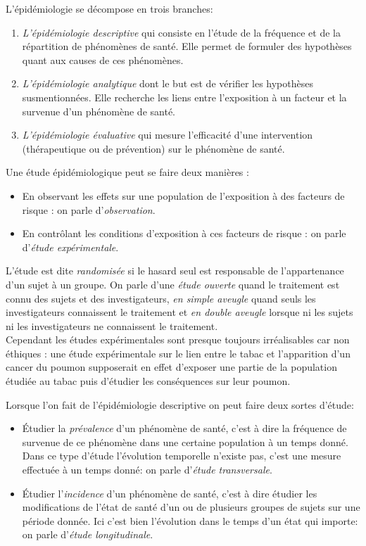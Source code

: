\documentclass{book}
\begin{document}
L'épidémiologie se décompose en trois branches:
\begin{enumerate}
\item \textit{L'épidémiologie descriptive} qui consiste en l'étude de la fréquence et de la répartition de phénomènes de santé.  Elle permet de formuler des hypothèses quant aux causes de ces phénomènes.
\item \textit{L'épidémiologie analytique} dont le but est de vérifier les hypothèses susmentionnées. Elle recherche les liens entre l'exposition à un facteur et la survenue d'un phénomène de santé.
\item \textit{L'épidémiologie évaluative} qui mesure l'efficacité d'une intervention (thérapeutique ou de prévention) sur le phénomène de santé.
\end{enumerate}

\bigskip

Une étude épidémiologique peut se faire deux manières :
\begin{itemize}
\item En observant les effets sur une population de l'exposition à des facteurs de risque : on parle d'\textit{observation}.
\item En contrôlant les conditions d'exposition à ces facteurs de risque : on parle d'\textit{étude expérimentale}.\\
\end{itemize}

\noindent
L'étude est dite \textit{randomisée} si le hasard seul est responsable de l'appartenance d'un sujet à un groupe. On parle d'une \textit{étude ouverte} quand le traitement est connu des sujets et des investigateurs, \textit{en simple aveugle} quand seuls les investigateurs connaissent le traitement et \textit{en double aveugle} lorsque ni les sujets ni les investigateurs ne connaissent le traitement.\\
Cependant les études expérimentales sont presque toujours irréalisables car non éthiques : une étude expérimentale sur le lien entre le tabac et l'apparition d'un cancer du poumon supposerait en effet d'exposer une partie de la population étudiée au tabac puis d'étudier les conséquences sur leur poumon.\\

\bigskip

\noindent
Lorsque l'on fait de l'épidémiologie descriptive on peut faire deux sortes d'étude:
\begin{itemize}
\item Étudier la \textit{prévalence} d'un phénomène de santé, c'est à dire la fréquence de survenue de ce phénomène dans une certaine population à un temps donné. Dans ce type d'étude l'évolution temporelle n'existe pas, c'est une mesure effectuée à un temps donné: on parle d'\textit{étude transversale}.
\item Étudier l'\textit{incidence} d'un phénomène de santé, c'est à dire étudier les modifications de l'état de santé d'un ou de plusieurs groupes de sujets sur une période donnée. Ici c'est bien l'évolution dans le temps d'un état qui importe: on parle d'\textit{étude longitudinale}.
\end{itemize}
\end{document}
